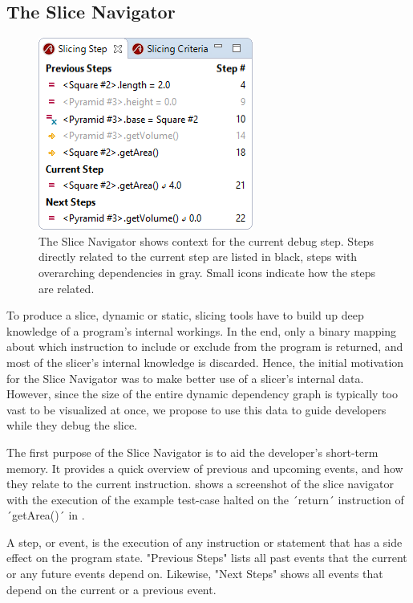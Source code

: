 \documentclass[
			english,
			review,
			]{elsarticle}
\begin{document}
\subsection{The Slice Navigator}
\label{sec:the_slice_navigator}

\begin{figure}
	\centering
		\includegraphics[width=0.40\linewidth]{slice1.png}
	\caption{The Slice Navigator shows context for the current debug step. Steps directly related to the current step are listed in black, steps with overarching dependencies in gray. Small icons indicate how the steps are related.}
	\label{fig:slice1}
\end{figure}

To produce a slice, dynamic or static, slicing tools have to build up deep knowledge of a program's internal workings.
In the end, only a binary mapping about which instruction to include or exclude from the program is returned, and most of the slicer's internal knowledge is discarded.
Hence, the initial motivation for the Slice Navigator was to make better use of a slicer's internal data.
However, since the size of the entire dynamic dependency graph is typically too vast to be visualized at once, we propose to use this data to guide developers while they debug the slice.

The first purpose of the Slice Navigator is to aid the developer's short-term memory.
It provides a quick overview of previous and upcoming events, and how they relate to the current instruction.
 shows a screenshot of the slice navigator with the execution of the example test-case halted on the ´return´ instruction of ´getArea()´ in .

A step, or event, is the execution of any instruction or statement that has a side effect on the program state.
"Previous Steps" lists all past events that the current or any future events depend on.
Likewise, "Next Steps" shows all events that depend on the current or a previous event.
\end{document}
